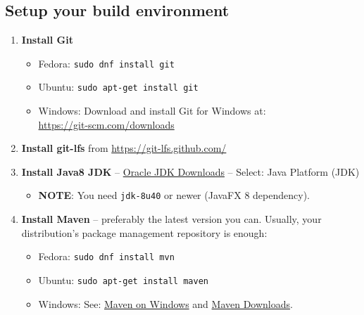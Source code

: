 \subsection*{Setup your build environment}
\begin{enumerate}

\item \textbf{Install Git}

\begin{itemize}

\item Fedora: \texttt{sudo dnf install git}

\item Ubuntu: \texttt{sudo apt-get install git}

\item Windows: Download and install Git for Windows at:\\ \url{https://git-scm.com/downloads}

\end{itemize}

\item \textbf{Install git-lfs} from \href{https://git-lfs.github.com/}{https://git-lfs.github.com/}

\item \textbf{Install Java8 JDK} -- \href{http://www.oracle.com/technetwork/java/javase/downloads/index.html}{Oracle JDK Downloads} -- Select: Java Platform (JDK)

\begin{itemize}

\item \textbf{NOTE}: You need \texttt{jdk-8u40} or newer (JavaFX 8 dependency).

\end{itemize}

\item \textbf{Install Maven} -- preferably the latest version you can.
Usually, your distribution's package management repository is enough:

\begin{itemize}

\item Fedora: \texttt{sudo dnf install mvn}

\item Ubuntu: \texttt{sudo apt-get install maven}

\item Windows: See: \href{http://maven.apache.org/guides/getting-started/windows-prerequisites.html}{Maven on Windows}
 and \href{http://maven.apache.org/download.cgi}{Maven Downloads}.


\end{itemize}
\end{enumerate}

